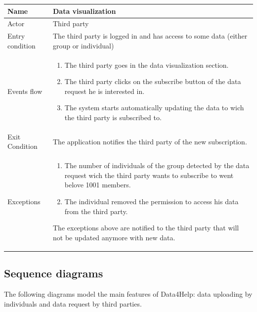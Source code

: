 \begin{tabular}{|l|p{11cm}|}
    \hline
    Name & Data visualization
    \\ \hline
    Actor & Third party
    \\ \hline 
    Entry condition & The third party is logged in and has access to some data (either group or individual)
        \\ \hline
    Events flow &
    \begin{enumerate}
    \item The third party goes in the data visualization section.
	\item The third party clicks on the subscribe button of the data request he is interested in.
	\item The system starts automatically updating the data to wich the third party is subscribed to.
    \end{enumerate}
     \\ \hline
     Exit Condition & The application notifies the third party of the new subscription.
     \\
    \hline
    Exceptions &
        \begin{enumerate}
    \item The number of individuals of the group detected by the data request wich the third party wants to subscribe to went belove 1001 members.
    \item The individual removed the permission to access his data from the third party.
\end{enumerate}  
 The exceptions above are notified to the third party that will not be updated anymore with new data.
  \\
    \hline
\end{tabular}







\subsection{Sequence diagrams}
The following diagrams model the main features of Data4Help: data uploading by individuals and data request by third parties.




